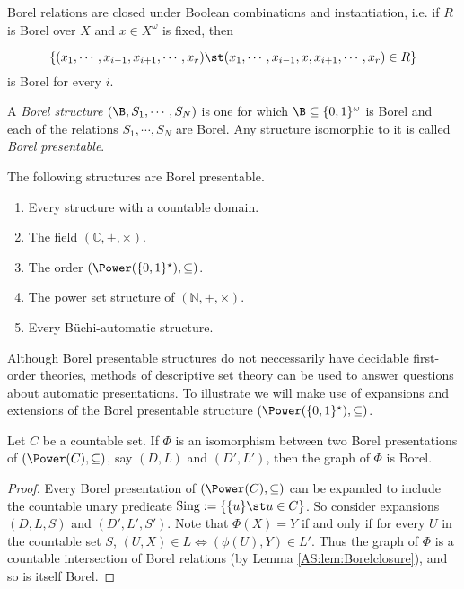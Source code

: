 \begin{lemma} \label{AS:lem:Borelclosure}
Borel relations are closed under Boolean combinations and instantiation, i.e. if $R$ is Borel over $X$ and $x \in X^\omega$ is fixed, then

\[
\{(x_1,\cdots,x_{i-1},x_{i+1},\cdots,x_r) \st (x_1,\cdots,x_{i-1},x,x_{i+1},\cdots,x_r) \in R\}
\]
 is Borel for every $i$.
\end{lemma}

\begin{definition} \label{AS:dfn:bap}
A {\em Borel structure} $(\B,S_1,\cdots,S_N)$ is one for which $\B \subseteq \{0,1\}^\omega$ is Borel 
and each of the relations $S_1,\cdots, S_N$ are Borel. Any structure isomorphic to it is called {\em Borel presentable}.
\end{definition}

\begin{example} The following structures are Borel presentable.
 \begin{enumerate}
  \item Every structure with a countable domain.
  \item The field $(\mathbb{C},+,\times)$.
  \item The order $(\Power(\{0,1\}^\star),\subseteq)$.
  \item The power set structure of $(\mathbb{N},+,\times)$.
  \item Every  B\"uchi-automatic structure.
 \end{enumerate}
\end{example}

Although Borel presentable structures do not neccessarily have decidable first-order theories, methods of descriptive set theory can
be used to answer questions about automatic presentations. To illustrate we will make use of expansions and extensions of the Borel presentable
structure $(\Power(\{0,1\}^\star),\subseteq)$. %

\begin{lemma}  \label{AS:lem:borel}
Let $C$ be a countable set.
If $\Phi$ is an isomorphism between two Borel presentations of $(\Power(C),\subseteq)$, say $(D,L)$ and $(D',L')$, 
then the graph of $\Phi$ is Borel.
\end{lemma}

\begin{proof}
Every Borel presentation of  $(\Power(C),\subseteq)$ can be expanded to include the countable unary predicate $\text{Sing} := \{\{u\} \st u \in C\}$.
So consider expansions $(D,L,S)$ and $(D',L',S')$. 
Note that $\Phi(X)=Y$ if and only if for every $U$ in the countable set $S$, $(U,X) \in L \iff (\phi(U),Y) \in L'$. Thus the graph of $\Phi$ is a countable intersection of Borel relations (by Lemma \ref{AS:lem:Borelclosure}), and so is itself Borel.
\end{proof}

